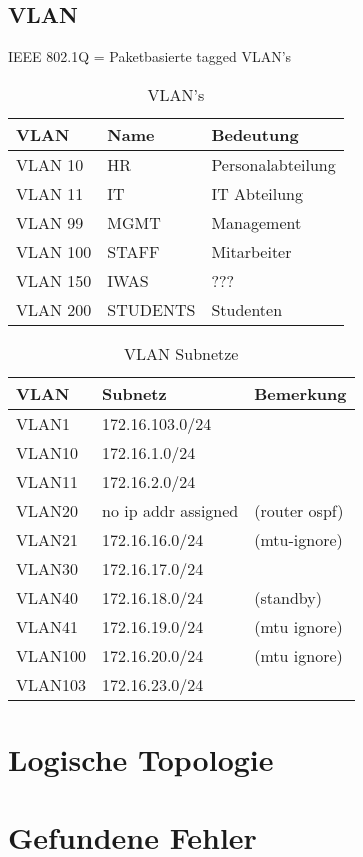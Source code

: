 \subsection{VLAN}
IEEE 802.1Q = Paketbasierte tagged VLAN's
\begin{table}[h]
	\centering
	\begin{tabu} to \linewidth {l l l}
		\toprule 
		VLAN & Name & Bedeutung \\
		\midrule
		VLAN 10 & HR & Personalabteilung \\
		VLAN 11 & IT & IT Abteilung \\
		VLAN 99 & MGMT & Management\\
		VLAN 100 & STAFF & Mitarbeiter\\
		VLAN 150 & IWAS & ???\\
		VLAN 200 & STUDENTS & Studenten\\
		\bottomrule 
	\end{tabu} 
	\caption{VLAN's}
\end{table}

\begin{table}[h]
	\centering
	\begin{tabu} to \linewidth {l l l}
		\toprule 
		VLAN & Subnetz & Bemerkung \\
		\midrule
		VLAN1 & 172.16.103.0/24 & \\
		VLAN10 & 172.16.1.0/24 & \\
		VLAN11 & 172.16.2.0/24 & \\
		VLAN20 & no ip addr assigned & (router ospf) \\
		VLAN21 & 172.16.16.0/24 & (mtu-ignore) \\
		VLAN30 & 172.16.17.0/24 & \\
		VLAN40 & 172.16.18.0/24 & (standby) \\
		VLAN41 & 172.16.19.0/24 & (mtu ignore) \\
		VLAN100 & 172.16.20.0/24 & (mtu ignore) \\
		VLAN103 & 172.16.23.0/24 & \\
		\bottomrule 
	\end{tabu} 
	\caption{VLAN Subnetze}
\end{table}

\section{Logische Topologie}

\section{Gefundene Fehler}

